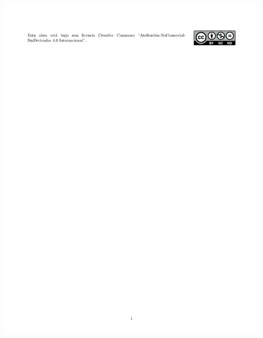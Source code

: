 \documentclass[10pt,twoside]{rcmart} %
\begin{document}
	\begin{flushright}
		\includegraphics[scale=0.93]{Licencia.pdf}
	\end{flushright}
\endgroup
\end{document}
